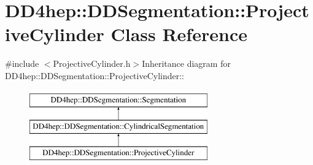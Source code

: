 \hypertarget{class_d_d4hep_1_1_d_d_segmentation_1_1_projective_cylinder}{
\section{DD4hep::DDSegmentation::ProjectiveCylinder Class Reference}
\label{class_d_d4hep_1_1_d_d_segmentation_1_1_projective_cylinder}
}


{\ttfamily \#include $<$ProjectiveCylinder.h$>$}Inheritance diagram for DD4hep::DDSegmentation::ProjectiveCylinder::\begin{figure}[H]
\begin{center}
\leavevmode
\includegraphics[height=3cm]{class_d_d4hep_1_1_d_d_segmentation_1_1_projective_cylinder}
\end{center}
\end{figure}
